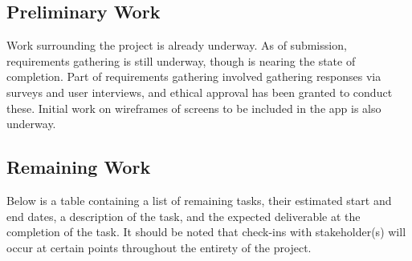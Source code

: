 \documentclass[12pt]{article}
\begin{document}
\subsection {Preliminary Work}
Work surrounding the project is already underway. As of submission, requirements gathering is still underway, though
is nearing the state of completion. Part of requirements gathering involved gathering responses via surveys and
user interviews, and ethical approval has been granted to conduct these. Initial work on 
wireframes of screens to be included in the app is also underway.
 

\subsection {Remaining Work}
Below is a table containing a list of remaining tasks, their estimated start and end dates, a description of the
task, and the expected deliverable at the completion of the task. It should be noted that check-ins with
stakeholder(s) will occur at certain points throughout the entirety of the project.

\newpage
\end{document}
